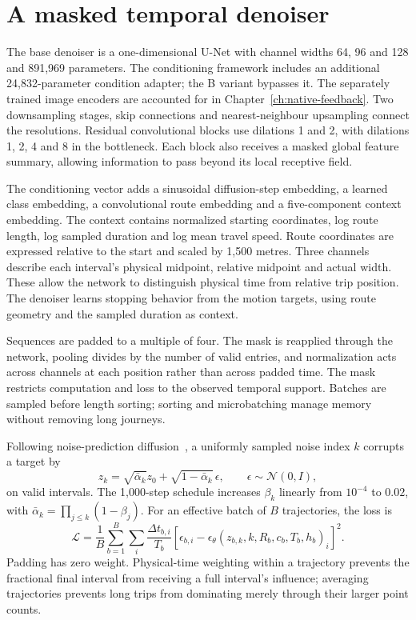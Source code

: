 \section{A masked temporal denoiser}
The base denoiser is a one-dimensional U-Net with channel widths 64, 96 and 128 and 891,969 parameters. The conditioning framework includes an additional 24,832-parameter condition adapter; the B variant bypasses it. The separately trained image encoders are accounted for in Chapter~\ref{ch:native-feedback}. Two downsampling stages, skip connections and nearest-neighbour upsampling connect the resolutions. Residual convolutional blocks use dilations 1 and 2, with dilations 1, 2, 4 and 8 in the bottleneck. Each block also receives a masked global feature summary, allowing information to pass beyond its local receptive field.

The conditioning vector adds a sinusoidal diffusion-step embedding, a learned class embedding, a convolutional route embedding and a five-component context embedding. The context contains normalized starting coordinates, log route length, log sampled duration and log mean travel speed. Route coordinates are expressed relative to the start and scaled by 1,500 metres. Three channels describe each interval's physical midpoint, relative midpoint and actual width. These allow the network to distinguish physical time from relative trip position. The denoiser learns stopping behavior from the motion targets, using route geometry and the sampled duration as context.

Sequences are padded to a multiple of four. The mask is reapplied through the network, pooling divides by the number of valid entries, and normalization acts across channels at each position rather than across padded time. The mask restricts computation and loss to the observed temporal support. Batches are sampled before length sorting; sorting and microbatching manage memory without removing long journeys.

Following noise-prediction diffusion~\cite{ddpm}, a uniformly sampled noise index $k$ corrupts a target by
\begin{equation}
 z_k=\sqrt{\bar\alpha_k}z_0+\sqrt{1-\bar\alpha_k}\,\epsilon,
 \qquad \epsilon\sim\mathcal N(0,I),
 \label{eq:native-forward}
\end{equation}
on valid intervals. The 1,000-step schedule increases $\beta_k$ linearly from $10^{-4}$ to $0.02$, with $\bar\alpha_k=\prod_{j\leq k}(1-\beta_j)$. For an effective batch of $B$ trajectories, the loss is
\begin{equation}
 \mathcal L=\frac{1}{B}\sum_{b=1}^{B}\sum_i
 \frac{\Delta t_{b,i}}{T_b}
 \left[\epsilon_{b,i}-\epsilon_\theta(z_{b,k},k,R_b,c_b,T_b,h_b)_i\right]^2.
 \label{eq:native-loss}
\end{equation}
Padding has zero weight. Physical-time weighting within a trajectory prevents the fractional final interval from receiving a full interval's influence; averaging trajectories prevents long trips from dominating merely through their larger point counts.

